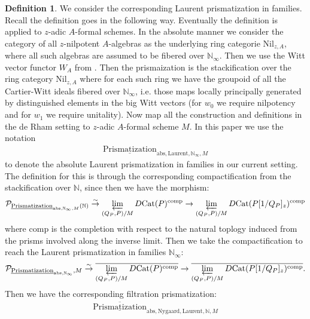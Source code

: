 \documentclass[12pt]{article}
\theoremstyle{definition}
\newtheorem{definition}{Definition}
\begin{document}
\begin{definition}
We consider the corresponding Laurent prismatization in families. Recall the definition goes in the following way. Eventually the definition is applied to $z$-adic $A$-formal schemes. In the absolute manner we consider the category of all $z$-nilpotent $A$-algebras as the underlying ring categorie $\mathrm{Nil}_{z,A}$, where all such algebras are assumed to be fibered over $\mathbb{N}_\infty$. Then we use the Witt vector functor $W_A$ from \cite{3LH}. Then the prismaization is the stackification over the ring category $\mathrm{Nil}_{z,A}$ where for each such ring we have the groupoid of all the Cartier-Witt ideals fibered over $\mathbb{N}_\infty$, i.e. those maps locally principally generated by distinguished elements in the big Witt vectors (for $w_0$ we require nilpotency and for $w_1$ we require unitality). Now map all the construction and definitions in the de Rham setting to $z$-adic $A$-formal scheme $M$. In this paper we use the notation 
\begin{align}
\underline{\mathrm{Prismatization}}_{\mathrm{abs},\mathrm{Laurent},\mathbb{N}_\infty,M}
\end{align}
to denote the absolute Laurent prismatization in families in our current setting. The definition for this is through the corresponding compactification from the stackification over $\mathbb{N}$, since then we have the morphism:
\begin{align}
\mathcal{P}_{\underline{\mathrm{Prismatization}}_{\mathrm{abs},\mathbb{N}_\infty,M}(\mathbb{N})} \overset{\sim}{\rightarrow} \varprojlim_{(Q_P,P)/M} D\mathrm{Cat}(P)^\mathrm{comp}\rightarrow \varprojlim_{(Q_P,P)/M} D\mathrm{Cat}(P[1/Q_P]_z)^\mathrm{comp}
\end{align}
where $\mathrm{comp}$ is the completion with respect to the natural toplogy induced from the prisms involved along the inverse limit. Then we take the compactification to reach the Laurent prismatization in families $\mathbb{N}_\infty$:
\begin{align}
\mathcal{P}_{\underline{\mathrm{Prismatization}}_{\mathrm{abs},\mathbb{N}_\infty},M} \overset{\sim}{\rightarrow} \overline{\varprojlim_{(Q_P,P)/M} D\mathrm{Cat}(P)^\mathrm{comp}}\rightarrow \overline{\varprojlim_{(Q_P,P)/M} D\mathrm{Cat}(P[1/Q_P]_z)^\mathrm{comp}}.
\end{align}
Then we have the corresponding filtration prismatization:
\begin{align}
\overline{\underline{\mathrm{Prismatization}}}_{\mathrm{abs},\mathrm{Nygaard},\mathrm{Laurent},\mathbb{N},M}

\end{align}
\end{definition}
\end{document}
